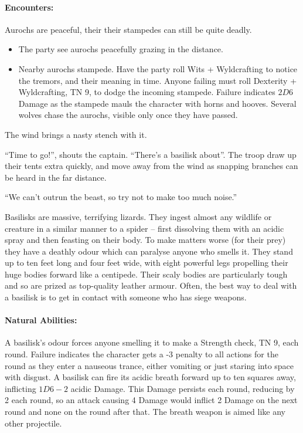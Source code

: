 \begin{multicols}{2}
\begin{boxtext}
\end{boxtext}

\paragraph{Encounters:} Aurochs are peaceful, their their stampedes can still be quite deadly.

\begin{itemize}

  \item
  The party see aurochs peacefully grazing in the distance.
  \item
  Nearby aurochs stampede.
  Have the party roll Wits + Wyldcrafting to notice the tremors, and their meaning in time.
  Anyone failing must roll Dexterity + Wyldcrafting, TN 9, to dodge the incoming stampede.
  Failure indicates $2D6$ Damage as the stampede mauls the character with horns and hooves.
  Several wolves chase the aurochs, visible only once they have passed.

\end{itemize}

\label{basilisk}
\basilisk

\begin{boxtext}

  The wind brings a nasty stench with it.

  ``Time to go!'', shouts the captain.
  ``There's a basilisk about''.
  The troop draw up their tents extra quickly, and move away from the wind as snapping branches can be heard in the far distance.

  ``We can't outrun the beast, so try not to make too much noise.''

\end{boxtext}

Basilisks are massive, terrifying lizards.
They ingest almost any wildlife or creature in a similar manner to a spider -- first dissolving them with an acidic spray and then feasting on their body.
To make matters worse (for their prey) they have a deathly odour which can paralyse anyone who smells it.
They stand up to ten feet long and four feet wide, with eight powerful legs propelling their huge bodies forward like a centipede.
Their scaly bodies are particularly tough and so are prized as top-quality leather armour.
Often, the best way to deal with a basilisk is to get in contact with someone who has siege weapons.

\paragraph{Natural Abilities:} A basilisk's odour forces anyone smelling it to make a Strength check, TN 9, each round.
Failure indicates the character gets a -3 penalty to all actions for the round as they enter a nauseous trance, either vomiting or just staring into space with disgust.
A basilisk can fire its acidic breath forward up to ten squares away, inflicting $1D6-2$ acidic Damage.
This Damage persists each round, reducing by 2  each round, so an attack causing 4 Damage would inflict 2  Damage on the next round and none on the round after that.
The breath weapon is aimed like any other projectile.


\end{multicols}
